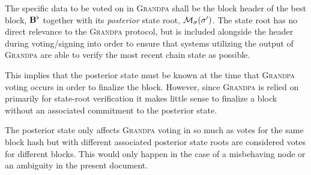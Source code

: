 The specific data to be voted on in \textsc{Grandpa} shall be the block header of the best block, $\mathbf{B}^\flat$ together with its \emph{posterior} state root, $\mathcal{M}_\sigma(\sigma')$. The state root has no direct relevance to the \textsc{Grandpa} protocol, but is included alongside the header during voting/signing into order to ensure that systems utilizing the output of \textsc{Grandpa} are able to verify the most recent chain state as possible.

This implies that the posterior state must be known at the time that \textsc{Grandpa} voting occurs in order to finalize the block. However, since \textsc{Grandpa} is relied on primarily for state-root verification it makes little sense to finalize a block without an associated commitment to the posterior state.

The posterior state only affects \textsc{Grandpa} voting in so much as votes for the same block hash but with different associated posterior state roots are considered votes for different blocks. This would only happen in the case of a misbehaving node or an ambiguity in the present document.